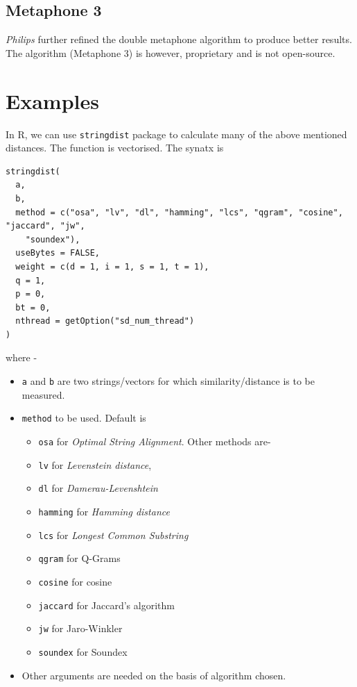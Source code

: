 \documentclass[
]{book}
\providecommand{\tightlist}{%
  \setlength{\itemsep}{0pt}\setlength{\parskip}{0pt}}
\begin{document}
\hypertarget{metaphone-3}{%
\subsection{Metaphone 3}\label{metaphone-3}}

\emph{Philips} further refined the double metaphone algorithm to produce better results. The algorithm (Metaphone 3) is however, proprietary and is not open-source.

\hypertarget{examples}{%
\section{Examples}\label{examples}}

In R, we can use \texttt{stringdist} package to calculate many of the above mentioned distances. The function is vectorised. The synatx is

\begin{verbatim}
stringdist(
  a,
  b,
  method = c("osa", "lv", "dl", "hamming", "lcs", "qgram", "cosine", "jaccard", "jw",
    "soundex"),
  useBytes = FALSE,
  weight = c(d = 1, i = 1, s = 1, t = 1),
  q = 1,
  p = 0,
  bt = 0,
  nthread = getOption("sd_num_thread")
)
\end{verbatim}

where -

\begin{itemize}
\tightlist
\item
  \texttt{a} and \texttt{b} are two strings/vectors for which similarity/distance is to be measured.
\item
  \texttt{method} to be used. Default is

  \begin{itemize}
  \tightlist
  \item
    \texttt{osa} for \emph{Optimal String Alignment}. Other methods are-
  \item
    \texttt{lv} for \emph{Levenstein distance},
  \item
    \texttt{dl} for \emph{Damerau-Levenshtein}
  \item
    \texttt{hamming} for \emph{Hamming distance}
  \item
    \texttt{lcs} for \emph{Longest Common Substring}
  \item
    \texttt{qgram} for Q-Grams
  \item
    \texttt{cosine} for cosine
  \item
    \texttt{jaccard} for Jaccard's algorithm
  \item
    \texttt{jw} for Jaro-Winkler
  \item
    \texttt{soundex} for Soundex
  \end{itemize}
\item
  Other arguments are needed on the basis of algorithm chosen.
\end{itemize}
\end{document}
